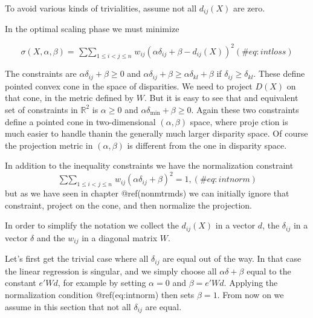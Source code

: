 \documentclass[
  12pt,
  letterpaper,
  DIV=11,
  numbers=noendperiod]{scrreprt}
\theoremstyle{remark}
\begin{document}
To avoid various kinds of trivialities, assume not all \(d_{ij}(X)\) are
zero.

In the optimal scaling phase we must minimize

\begin{equation}
\sigma(X,\alpha,\beta)=\mathop{\sum\sum}_{1\leq i<j\leq  n}w_{ij}(\alpha\delta_{ij}+\beta-d_{ij}(X))^2
(\#eq:intloss)
\end{equation}

The constraints are \(\alpha\delta_{ij}+\beta\geq 0\) and
\(\alpha\delta_{ij}+\beta\geq\alpha\delta_{kl}+\beta\) if
\(\delta_{ij}\geq\delta_{kl}\). These define pointed convex cone in the
space of disparities. We need to project \(D(X)\) on that cone, in the
metric defined by \(W\). But it is easy to see that and equivalent set
of constraints in \(\mathbb{R}^2\) is \(\alpha\geq 0\) and
\(\alpha\delta_\text{min}+\beta\geq 0\). Again these two constraints
define a pointed cone in two-dimensional \((\alpha,\beta)\) space, where
proje ction is much easier to handle thanin the generally much larger
disparity space. Of course the projection metric in \((\alpha,\beta)\)
is different from the one in disparity space.

In addition to the inequality constraints we have the normalization
constraint \begin{equation}
\mathop{\sum\sum}_{1\leq i<j\leq  n}w_{ij}(\alpha\delta_{ij}+\beta)^2=1,
(\#eq:intnorm)
\end{equation} but as we have seen in chapter @ref(nonmtrmds) we can
initially ignore that constraint, project on the cone, and then
normalize the projection.

In order to simplify the notation we collect the \(d_{ij}(X)\) in a
vector \(d\), the \(\delta_{ij}\) in a vector \(\delta\) and the
\(w_{ij}\) in a diagonal matrix \(W\).

Let's first get the trivial case where all \(\delta_{ij}\) are equal out
of the way. In that case the linear regression is singular, and we
simply choose all \(\alpha\delta+\beta\) equal to the constant \(e'Wd\),
for example by setting \(\alpha=0\) and \(\beta=e'Wd\). Applying the
normalization condition @ref(eq:intnorm) then sets \(\beta=1\). From now
on we assume in this section that not all \(\delta_{ij}\) are equal.
\end{document}
